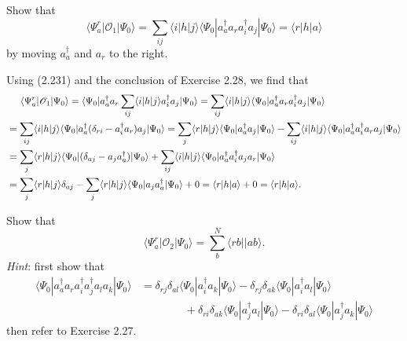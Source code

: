 \documentclass[a4paper]{book}
\newcounter{exercise}[chapter]
\newcounter{solution}[chapter]
\begin{document}
	\begin{exercise}
	Show that
	\[
		\langle \Psi^r_a | \mathscr{O}_1 | \Psi_0 \rangle = \sum_{ij} \langle i | h | j \rangle \langle \Psi_0 | a^\dagger_a a_r a^\dagger_i a_j | \Psi_0 \rangle = \langle r | h | a \rangle
	\]
	by moving $a^\dagger_a$ and $a_r$ to the right.
	\end{exercise}
	
	\begin{solution}
	
	Using (2.231) and the conclusion of Exercise 2.28, we find that
	\begin{align*}
		&\hspace{1.4em}\langle \Psi^r_a | \mathscr{O}_1 | \Psi_0 \rangle = \langle \Psi_0 | a^\dagger_a a_r \sum_{ij} \langle i | h | j \rangle a^\dagger_i a_j | \Psi_0 \rangle = \sum_{ij} \langle i | h | j \rangle \langle \Psi_0 | a^\dagger_a a_r a^\dagger_i a_j | \Psi_0 \rangle \\
		&= \sum_{ij} \langle i | h | j \rangle \langle \Psi_0 | a^\dagger_a ( \delta_{ri} - a^\dagger_i a_r ) a_j | \Psi_0 \rangle = \sum_j \langle r | h | j \rangle \langle \Psi_0 | a^\dagger_a a_j | \Psi_0 \rangle - \sum_{ij} \langle i | h | j \rangle \langle \Psi_0 | a^\dagger_a a^\dagger_i a_r a_j | \Psi_0 \rangle \\
		&= \sum_j \langle r | h | j \rangle \langle \Psi_0 | ( \delta_{aj} - a_j a^\dagger_a ) | \Psi_0 \rangle + \sum_{ij} \langle i | h | j \rangle \langle \Psi_0 | a^\dagger_a a^\dagger_i a_j a_r | \Psi_0 \rangle \\
		&= \sum_j \langle r | h | j \rangle \delta_{aj} - \sum_j \langle r | h | j \rangle \langle \Psi_0 | a_j a^\dagger_a | \Psi_0 \rangle + 0 = \langle r | h | a \rangle + 0 = \langle r | h | a \rangle .
	\end{align*}
	
	\end{solution}
	
	\begin{exercise}
	Show that
	\[
		\langle \Psi^r_a | \mathscr{O}_2 | \Psi_0 \rangle = \sum_b^N \langle rb || ab \rangle .
	\]
	{\it Hint}: first show that
	\begin{align*}
		\langle \Psi_0 | a^\dagger_a a_r a^\dagger_i a^\dagger_j a_l a_k | \Psi_0 \rangle &= \delta_{rj} \delta_{al} \langle \Psi_0 | a^\dagger_i a_k | \Psi_0 \rangle - \delta_{rj} \delta_{ak} \langle \Psi_0 | a^\dagger_i a_l | \Psi_0 \rangle \\
		&\hspace{4em} + \delta_{ri} \delta_{ak} \langle \Psi_0 | a^\dagger_j a_l | \Psi_0 \rangle - \delta_{ri} \delta_{al} \langle \Psi_0 | a^\dagger_j a_k | \Psi_0 \rangle
	\end{align*}
	then refer to Exercise 2.27.
	\end{exercise}
	
\end{document}
